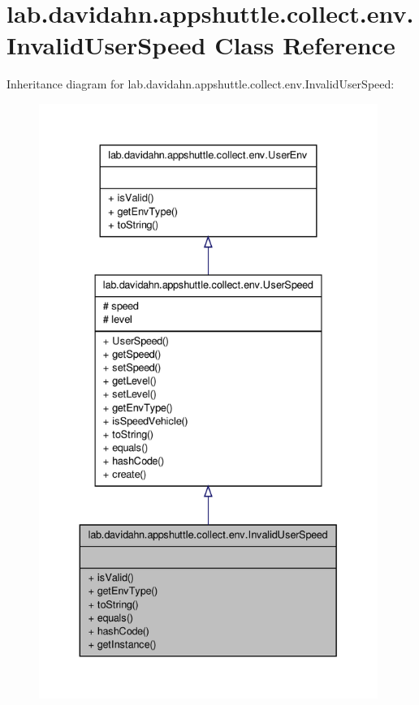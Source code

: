 \hypertarget{classlab_1_1davidahn_1_1appshuttle_1_1collect_1_1env_1_1_invalid_user_speed}{\section{lab.\-davidahn.\-appshuttle.\-collect.\-env.\-Invalid\-User\-Speed \-Class \-Reference}
\label{classlab_1_1davidahn_1_1appshuttle_1_1collect_1_1env_1_1_invalid_user_speed}
}


\-Inheritance diagram for lab.\-davidahn.\-appshuttle.\-collect.\-env.\-Invalid\-User\-Speed\-:
\nopagebreak
\begin{figure}[H]
\begin{center}
\leavevmode
\includegraphics[height=550pt]{classlab_1_1davidahn_1_1appshuttle_1_1collect_1_1env_1_1_invalid_user_speed__inherit__graph}
\end{center}
\end{figure}


